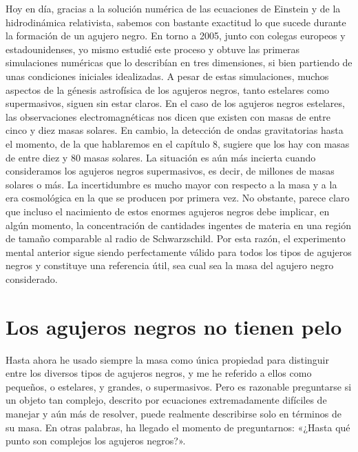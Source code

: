 Hoy en día, gracias a la solución numérica de las ecuaciones de Einstein y de la hidrodinámica relativista, sabemos con bastante exactitud lo que sucede durante la formación de un agujero negro. En torno a 2005, junto con colegas europeos y estadounidenses, yo mismo estudié este proceso y obtuve las primeras simulaciones numéricas que lo describían en tres dimensiones, si bien partiendo de unas condiciones iniciales idealizadas. A pesar de estas simulaciones, muchos aspectos de la génesis astrofísica de los agujeros negros, tanto estelares como supermasivos, siguen sin estar claros. En el caso de los agujeros negros estelares, las observaciones electromagnéticas nos dicen que existen con masas de entre cinco y diez masas solares. En cambio, la detección de ondas gravitatorias hasta el momento, de la que hablaremos en el capítulo 8, sugiere que los hay con masas de entre diez y 80 masas solares. La situación es aún más incierta cuando consideramos los agujeros negros supermasivos, es decir, de millones de masas solares o más. La incertidumbre es mucho mayor con respecto a la masa y a la era cosmológica en la que se producen por primera vez. No obstante, parece claro que incluso el nacimiento de estos enormes agujeros negros debe implicar, en algún momento, la concentración de cantidades ingentes de materia en una región de tamaño comparable al radio de Schwarzschild. Por esta razón, el experimento mental anterior sigue siendo perfectamente válido para todos los tipos de agujeros negros y constituye una referencia útil, sea cual sea la masa del agujero negro considerado.

\section{Los agujeros negros no tienen pelo}\label{sec:06-hair}

Hasta ahora he usado siempre la masa como única propiedad para distinguir entre los diversos tipos de agujeros negros, y me he referido a ellos como pequeños, o estelares, y grandes, o supermasivos. Pero es razonable preguntarse si un objeto tan complejo, descrito por ecuaciones extremadamente difíciles de manejar y aún más de resolver, puede realmente describirse solo en términos de su masa. En otras palabras, ha llegado el momento de preguntarnos: «¿Hasta qué punto son complejos los agujeros negros?».

